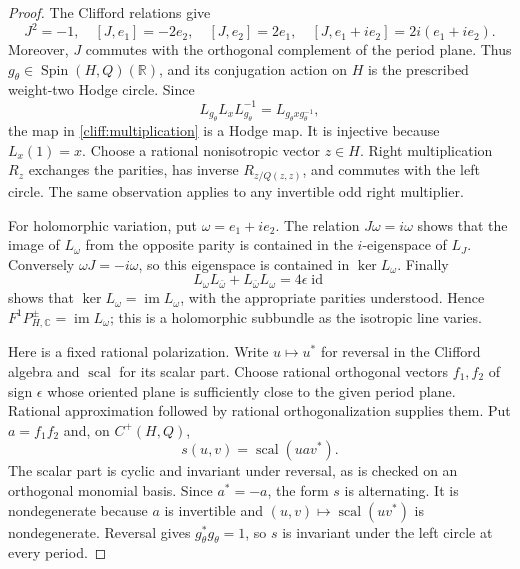 \begin{proof}
The Clifford relations give
\[
 J^2=-1,\quad [J,e_1]=-2e_2,\quad [J,e_2]=2e_1,
 \quad [J,e_1+i e_2]=2i(e_1+i e_2).
\]
Moreover, $J$ commutes with the orthogonal complement of the period
plane. Thus $g_\theta\in\operatorname{Spin}(H,Q)(\mathbb R)$, and its
conjugation action on $H$ is the prescribed weight-two Hodge circle.
Since
\[
 L_{g_\theta}L_xL_{g_\theta}^{-1}
   =L_{g_\theta xg_\theta^{-1}},
\]
the map in \eqref{cliff:multiplication} is a Hodge map. It is injective
because $L_x(1)=x$.
Choose a rational nonisotropic vector $z\in H$. Right multiplication
$R_z$ exchanges the parities, has inverse $R_{z/Q(z,z)}$, and commutes
with the left circle. The same observation applies to any invertible
odd right multiplier.

For holomorphic variation, put $\omega=e_1+i e_2$.
The relation $J\omega=i\omega$ shows that the image of $L_\omega$
from the opposite parity is contained in the $i$-eigenspace of $L_J$.
Conversely $\omega J=-i\omega$, so this eigenspace is contained in
$\ker L_\omega$. Finally
\[
 L_\omega L_{\bar\omega}+L_{\bar\omega}L_\omega
       =4\epsilon\operatorname{id}
\]
shows that $\ker L_\omega=\operatorname{im}L_\omega$, with the
appropriate parities understood. Hence
$F^1P_{H,\mathbb C}^\pm=\operatorname{im}L_\omega$; this is a
holomorphic subbundle as the isotropic line varies.

Here is a fixed rational polarization. Write $u\mapsto u^*$ for
reversal in the Clifford algebra and $\operatorname{scal}$ for its
scalar part. Choose rational orthogonal vectors $f_1,f_2$ of sign
$\epsilon$ whose oriented plane is sufficiently close to the given
period plane. Rational approximation followed by rational
orthogonalization supplies them. Put $a=f_1f_2$ and, on $C^+(H,Q)$,
\begin{equation}\label{cliff:polarizing-form}
 s(u,v)=\operatorname{scal}(uav^*).
\end{equation}
The scalar part is cyclic and invariant under reversal, as is checked
on an orthogonal monomial basis. Since $a^*=-a$, the form $s$ is
alternating. It is nondegenerate because $a$ is invertible and
$(u,v)\mapsto\operatorname{scal}(uv^*)$ is nondegenerate. Reversal
gives $g_\theta^*g_\theta=1$, so $s$ is invariant under the left circle
at every period.


\end{proof}
